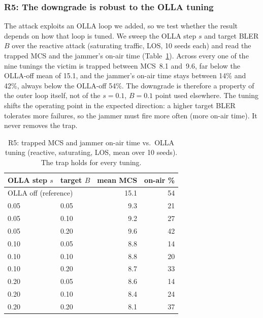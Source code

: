 \documentclass[conference]{IEEEtran}
\begin{document}
\subsubsection*{R5: The downgrade is robust to the OLLA tuning}
The attack exploits an OLLA loop we added, so we test whether the result depends on how
that loop is tuned. We sweep the OLLA step $s$ and target BLER $B$ over the reactive
attack (saturating traffic, LOS, 10 seeds each) and read the trapped MCS and the
jammer's on-air time (Table~\ref{tab:r5a}). Across every one of the nine tunings the victim is
trapped between MCS~8.1 and~9.6, far below the OLLA-off mean of 15.1, and the jammer's on-air time
stays between 14\% and 42\%, always below the OLLA-off 54\%. The downgrade is
therefore a property of the outer loop itself, not of the $s=0.1$, $B=0.1$ point used
elsewhere. The tuning shifts the operating point in the expected direction: a higher
target BLER tolerates more failures, so the jammer must fire more often (more on-air
time). It never removes the trap.

\begin{table}[t]\centering
\caption{R5: trapped MCS and jammer on-air time vs.\ OLLA tuning (reactive, saturating,
LOS, mean over 10 seeds). The trap holds for every tuning.}
\label{tab:r5a}
\begin{tabular}{llrr}\toprule
OLLA step $s$ & target $B$ & mean MCS & on-air \% \\\midrule
\multicolumn{2}{l}{OLLA off (reference)} & 15.1 & 54 \\
0.05 & 0.05 & 9.3 & 21 \\
0.05 & 0.10 & 9.2 & 27 \\
0.05 & 0.20 & 9.6 & 42 \\
0.10 & 0.05 & 8.8 & 14 \\
0.10 & 0.10 & 8.8 & 20 \\
0.10 & 0.20 & 8.7 & 33 \\
0.20 & 0.05 & 8.6 & 14 \\
0.20 & 0.10 & 8.4 & 24 \\
0.20 & 0.20 & 8.1 & 37 \\\bottomrule
\end{tabular}\end{table}
\end{document}
